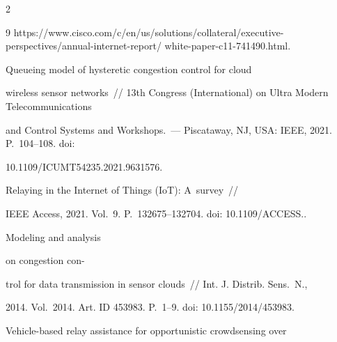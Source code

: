 \begin{multicols}{2}
{{\begin{thebibliography}{9}
{https://www.cisco.com/c/en/us/solutions/\linebreak collateral/executive-perspectives/annual-internet-report/ white-paper-c11-741490.html}.










 Queueing model of hysteretic congestion control for cloud 


wireless sensor networks~// 13th Congress (International) on Ultra Modern Telecommunications 


and Control Systems and Workshops.~--- Piscataway, NJ, USA: IEEE, 2021. P.~104--108. doi: 


10.1109/ICUMT54235.2021.9631576.




 Relaying in the Internet of Things (IoT): A~survey~// 


IEEE Access, 2021. Vol.~9. P.~132675--132704. doi: 10.1109/ACCESS..







 Modeling and analysis 


on congestion con-\linebreak\vspace*{-12pt}





\pagebreak





\noindent


trol for data transmission in sensor clouds~// Int. J. Distrib. Sens.~N., 


2014. Vol.~2014. Art. ID 453983. P.~1--9. doi: 10.1155/2014/453983.


 




 Vehicle-based relay assistance for opportunistic crowdsensing over 



\end{thebibliography}}}
\end{multicols}
